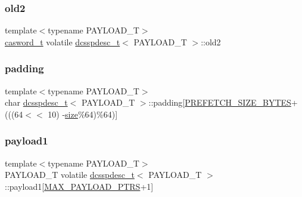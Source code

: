 \subsubsection{\texorpdfstring{old2}{old2}}
{\footnotesize\ttfamily template$<$typename P\+A\+Y\+L\+O\+A\+D\+\_\+T$>$ \\
\hyperlink{rq__unsafe_8h_ad45142aaf2ff20a036dc6242b8483e9c}{casword\+\_\+t} volatile \hyperlink{classdcsspdesc__t}{dcsspdesc\+\_\+t}$<$ P\+A\+Y\+L\+O\+A\+D\+\_\+T $>$\+::old2}

\mbox{\label{classdcsspdesc__t_a4708b8a87b5acd2011cff6783260bd67}} 
\subsubsection{\texorpdfstring{padding}{padding}}
{\footnotesize\ttfamily template$<$typename P\+A\+Y\+L\+O\+A\+D\+\_\+T$>$ \\
char \hyperlink{classdcsspdesc__t}{dcsspdesc\+\_\+t}$<$ P\+A\+Y\+L\+O\+A\+D\+\_\+T $>$\+::padding\mbox{[}\hyperlink{plaf_8h_a9492d3f4847aa8514510373df7ad0e73}{P\+R\+E\+F\+E\+T\+C\+H\+\_\+\+S\+I\+Z\+E\+\_\+\+B\+Y\+T\+ES}+(((64$<$$<$ 10) -\/\hyperlink{classdcsspdesc__t_a29649c162a785ff33c3fb6967a9838f7}{size}\%64)\%64)\mbox{]}}

\mbox{\label{classdcsspdesc__t_a0e0868123124f0cb23e875efe07bf095}} 
\subsubsection{\texorpdfstring{payload1}{payload1}}
{\footnotesize\ttfamily template$<$typename P\+A\+Y\+L\+O\+A\+D\+\_\+T$>$ \\
P\+A\+Y\+L\+O\+A\+D\+\_\+T volatile \hyperlink{classdcsspdesc__t}{dcsspdesc\+\_\+t}$<$ P\+A\+Y\+L\+O\+A\+D\+\_\+T $>$\+::payload1\mbox{[}\hyperlink{dcss__plus_8h_af06e916cb13168b5e10308a196165616}{M\+A\+X\+\_\+\+P\+A\+Y\+L\+O\+A\+D\+\_\+\+P\+T\+RS}+1\mbox{]}}

\mbox{\label{classdcsspdesc__t_a2853d789dfb225f45783af8c1c7d2b3e}} 
